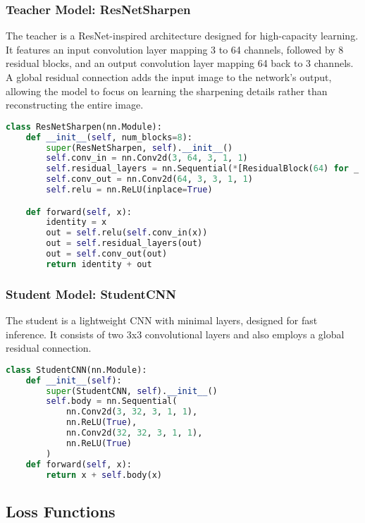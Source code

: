 \documentclass[12pt,a4paper]{article}
\begin{document}
\subsubsection{Teacher Model: ResNetSharpen}
The teacher is a ResNet-inspired architecture designed for high-capacity learning. It features an input convolution layer mapping 3 to 64 channels, followed by 8 residual blocks, and an output convolution layer mapping 64 back to 3 channels. A global residual connection adds the input image to the network's output, allowing the model to focus on learning the sharpening details rather than reconstructing the entire image.

\begin{lstlisting}[language=Python, caption={ResNetSharpen Teacher Model Architecture}]
class ResNetSharpen(nn.Module):
    def __init__(self, num_blocks=8):
        super(ResNetSharpen, self).__init__()
        self.conv_in = nn.Conv2d(3, 64, 3, 1, 1)
        self.residual_layers = nn.Sequential(*[ResidualBlock(64) for _ in range(num_blocks)])
        self.conv_out = nn.Conv2d(64, 3, 3, 1, 1)
        self.relu = nn.ReLU(inplace=True)

    def forward(self, x):
        identity = x
        out = self.relu(self.conv_in(x))
        out = self.residual_layers(out)
        out = self.conv_out(out)
        return identity + out
\end{lstlisting}

\subsubsection{Student Model: StudentCNN}
The student is a lightweight CNN with minimal layers, designed for fast inference. It consists of two 3x3 convolutional layers and also employs a global residual connection.

\begin{lstlisting}[language=Python, caption={StudentCNN Architecture}]
class StudentCNN(nn.Module):
    def __init__(self):
        super(StudentCNN, self).__init__()
        self.body = nn.Sequential(
            nn.Conv2d(3, 32, 3, 1, 1), 
            nn.ReLU(True), 
            nn.Conv2d(32, 32, 3, 1, 1), 
            nn.ReLU(True)
        )
    def forward(self, x): 
        return x + self.body(x)
\end{lstlisting}

\subsection{Loss Functions}
\end{document}

